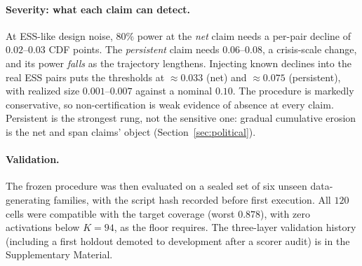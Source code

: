 \paragraph{Severity: what each claim can detect.} At ESS-like design noise,
$80\%$ power at the \emph{net} claim needs a per-pair decline of $0.02$--$0.03$
CDF points. The \emph{persistent} claim needs $0.06$--$0.08$, a
crisis-scale change, and its power \emph{falls} as the trajectory
lengthens. Injecting known declines into the real ESS pairs puts the
thresholds at $\approx0.033$ (net) and $\approx0.075$ (persistent), with
realized size $0.001$--$0.007$ against a nominal $0.10$. The procedure is
markedly conservative, so non-certification is weak evidence of absence at
every claim. Persistent is the strongest rung, not the sensitive one: gradual
cumulative erosion is the net and span claims' object
(Section~\ref{sec:political}).

\paragraph{Validation.} The frozen procedure was then evaluated on a sealed
set of six unseen data-generating families, with the script hash recorded
before first execution. All $120$ cells were compatible with the target
coverage (worst $0.878$), with zero activations below $K=94$, as the floor
requires. The three-layer validation history (including a first
holdout demoted to development after a scorer audit) is in the
Supplementary Material.

